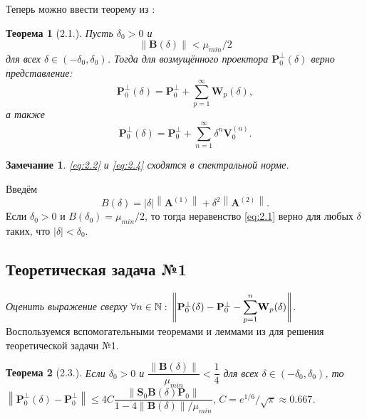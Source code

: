 \documentclass[fleqn]{article}
\newcommand\norm[1]{\left\|#1\right\|}
\renewcommand\b[1]{\mathbf{#1}}
\newtheorem{theorem}{Теорема}
\newtheorem{remark}{Замечание}
\begin{document}
	Теперь можно ввести теорему из \cite{Nekrutkin10}:
	\begin{theorem}[2.1.]\rm%
		Пусть $\delta_0>0$ и
		\begin{equation}\label{eq:2.1}
			\norm{\mathbf{B}(\delta)}<\mu_{min}/2
		\end{equation}
		для всех $\delta\in(-\delta_0,\delta_0)$. Тогда для возмущённого проектора $\mathbf{P}_0^\bot(\delta)$ верно представление:
		\begin{equation}\label{eq:2.2}
			\mathbf{P}_0^\bot(\delta)=\mathbf{P}_0^\bot + \sum_{p=1}^\infty\mathbf{W}_p(\delta),
		\end{equation}
		а также
		\begin{equation}\label{eq:2.4}
			\mathbf{P}_0^\bot(\delta) = \mathbf{P}_0^\bot + \sum_{n=1}^\infty\delta^n\mathbf{V}_0^{(n)}.
		\end{equation}
\end{theorem}
\begin{remark}
 \eqref{eq:2.2} и \eqref{eq:2.4} сходятся в спектральной норме.
 \end{remark}
		Введём
 		\begin{equation}
			B(\delta) = |\delta|\norm{\mathbf{A}^{(1)}}+\delta^2\norm{\mathbf{A}^{(2)}}.
		\end{equation}
		Если $\delta_0>0$ и $B(\delta_0)=\mu_{min}/2$, то тогда неравенство \eqref{eq:2.1} верно для любых $\delta$ таких, что $|\delta|<\delta_0$.
	
\subsection{Теоретическая задача №1}
	\emph{Оценить выражение сверху }$\forall n\in\mathbb{N}:\,\norm{\b{P}_0^\bot(\delta) - \b{P}_0^\bot - \mathlarger{\sum}\limits^n_{p=1}\b{W}_p(\delta)}$.\\
	Воспользуемся вспомогательными теоремами и леммами из \cite{Nekrutkin10} для решения теоретической задачи №1.
	\vspace*{\baselineskip}
	\begin{theorem}[2.3.]
		\rm Если $\delta_0 > 0$ и $\dfrac{\norm{\b{B}(\delta)}}{\mu_{min}} < \dfrac{1}{4}$ для всех $\delta \in (-\delta_0, \delta_0)$, то $\norm{\b{P}_0^\bot(\delta) - \b{P}_0^\bot} \leqslant 4C\dfrac{\norm{\b{S}_0\b{B}(\delta)\b{P}_0}}{1 - 4\norm{\b{B}(\delta)}/\mu_{min}},\,C = e^{1/6}/\sqrt{\pi}\approx0.667$.
	\end{theorem}
\end{document}
